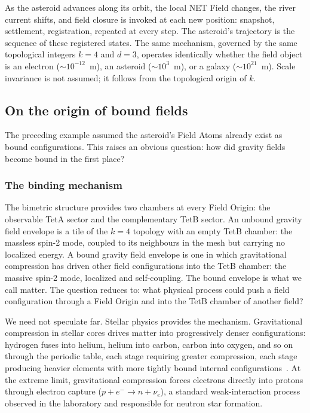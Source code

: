\documentclass[aps,prd,preprint,superscriptaddress,showpacs,preprintnumbers,amsmath,amssymb,nofootinbib]{revtex4-2}
\begin{document}
As the asteroid advances along its orbit, the local NET Field changes, the river current shifts, and field closure is invoked at each new position: snapshot, settlement, registration, repeated at every step. The asteroid's trajectory is the sequence of these registered states. The same mechanism, governed by the same topological integers $k = 4$ and $d = 3$, operates identically whether the field object is an electron ($\sim 10^{-12}$~m), an asteroid ($\sim 10^{3}$~m), or a galaxy ($\sim 10^{21}$~m). Scale invariance is not assumed; it follows from the topological origin of $k$.

\subsection{On the origin of bound fields}
\label{subsec:bound-origin}

The preceding example assumed the asteroid's Field Atoms already exist as bound configurations. This raises an obvious question: how did gravity fields become bound in the first place?

\subsubsection*{The binding mechanism}

The bimetric structure provides two chambers at every Field Origin: the observable TetA sector and the complementary TetB sector. An unbound gravity field envelope is a tile of the $k = 4$ topology with an empty TetB chamber: the massless spin-2 mode, coupled to its neighbours in the mesh but carrying no localized energy. A bound gravity field envelope is one in which gravitational compression has driven other field configurations into the TetB chamber: the massive spin-2 mode, localized and self-coupling. The bound envelope is what we call matter. The question reduces to: what physical process could push a field configuration through a Field Origin and into the TetB chamber of another field?

We need not speculate far. Stellar physics provides the mechanism. Gravitational compression in stellar cores drives matter into progressively denser configurations: hydrogen fuses into helium, helium into carbon, carbon into oxygen, and so on through the periodic table, each stage requiring greater compression, each stage producing heavier elements with more tightly bound internal configurations~\cite{burbidge1957}. At the extreme limit, gravitational compression forces electrons directly into protons through electron capture ($p + e^- \to n + \nu_e$), a standard weak-interaction process observed in the laboratory and responsible for neutron star formation.
\end{document}
